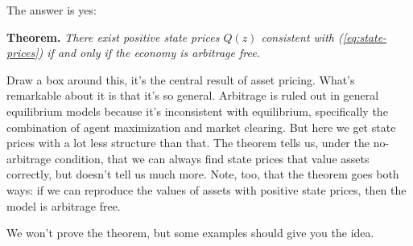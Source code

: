 \documentclass[11pt]{article}
\begin{document}
The answer is yes:

{\bf Theorem.\/}  {\it There exist positive state prices $Q(z)$
consistent with (\ref{eq:state-prices})
if and only if the economy is arbitrage free.\/}

Draw a box around this, it's the central result of asset pricing.
What's remarkable about it is that it's so general.
Arbitrage is ruled out in general equilibrium models
because it's inconsistent with equilibrium,
specifically the combination of agent maximization and market clearing.
But here we get state prices with a lot less structure than that.
The theorem tells us, under the no-arbitrage condition,
that we can always find state prices that value assets
correctly, but doesn't tell us much more.
Note, too, that the theorem goes both ways:
if we can reproduce the values of assets with positive state prices,
then the model is arbitrage free.

We won't prove the theorem, but some examples should give you the idea.
\end{document}
